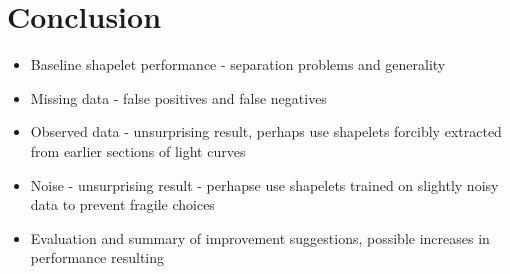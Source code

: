 \section{Conclusion}
\begin{itemize}
	\item Baseline shapelet performance - separation problems and generality
	\item Missing data - false positives and false negatives
	\item Observed data - unsurprising result, perhaps use shapelets forcibly extracted from earlier sections of light curves
	\item Noise - unsurprising result - perhapse use shapelets trained on slightly noisy data to prevent fragile choices
	\item Evaluation and summary of improvement suggestions, possible increases in performance resulting
\end{itemize}

%
%




